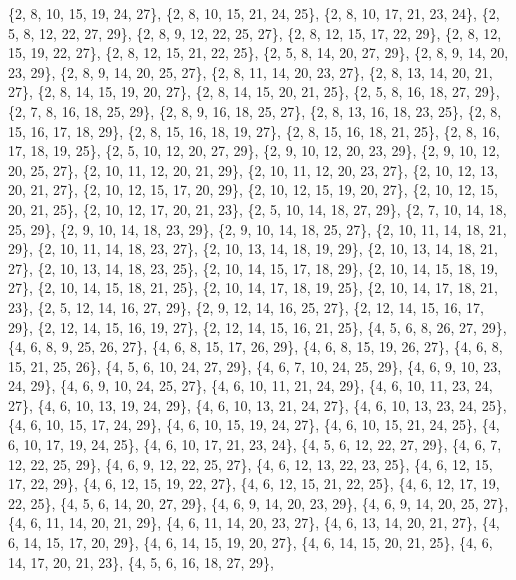 \documentclass[11pt,a4paper]{article}
\begin{document}
{\{2, 8, 10, 15, 19, 24, 27\}, \{2, 8, 10, 15, 21, 24, 25\}, \{2, 8, 10, 17, 21, 23, 24\}, \{2, 5, 8, 12, 22, 27, 29\}, \{2, 8, 9, 12, 22, 25, 27\},
\{2, 8, 12, 15, 17, 22, 29\}, \{2, 8, 12, 15, 19, 22, 27\}, \{2, 8, 12, 15, 21, 22, 25\}, \{2, 5, 8, 14, 20, 27, 29\}, \{2, 8, 9, 14, 20, 23, 29\},
\{2, 8, 9, 14, 20, 25, 27\}, \{2, 8, 11, 14, 20, 23, 27\}, \{2, 8, 13, 14, 20, 21, 27\}, \{2, 8, 14, 15, 19, 20, 27\}, \{2, 8, 14, 15, 20, 21, 25\},
\{2, 5, 8, 16, 18, 27, 29\}, \{2, 7, 8, 16, 18, 25, 29\}, \{2, 8, 9, 16, 18, 25, 27\}, \{2, 8, 13, 16, 18, 23, 25\}, \{2, 8, 15, 16, 17, 18, 29\},
\{2, 8, 15, 16, 18, 19, 27\}, \{2, 8, 15, 16, 18, 21, 25\}, \{2, 8, 16, 17, 18, 19, 25\}, \{2, 5, 10, 12, 20, 27, 29\}, \{2, 9, 10, 12, 20, 23, 29\},
\{2, 9, 10, 12, 20, 25, 27\}, \{2, 10, 11, 12, 20, 21, 29\}, \{2, 10, 11, 12, 20, 23, 27\}, \{2, 10, 12, 13, 20, 21, 27\}, \{2, 10, 12, 15, 17, 20, 29\},
\{2, 10, 12, 15, 19, 20, 27\}, \{2, 10, 12, 15, 20, 21, 25\}, \{2, 10, 12, 17, 20, 21, 23\}, \{2, 5, 10, 14, 18, 27, 29\}, \{2, 7, 10, 14, 18, 25, 29\},
\{2, 9, 10, 14, 18, 23, 29\}, \{2, 9, 10, 14, 18, 25, 27\}, \{2, 10, 11, 14, 18, 21, 29\}, \{2, 10, 11, 14, 18, 23, 27\}, \{2, 10, 13, 14, 18, 19, 29\},
\{2, 10, 13, 14, 18, 21, 27\}, \{2, 10, 13, 14, 18, 23, 25\}, \{2, 10, 14, 15, 17, 18, 29\}, \{2, 10, 14, 15, 18, 19, 27\}, \{2, 10, 14, 15, 18, 21, 25\},
\{2, 10, 14, 17, 18, 19, 25\}, \{2, 10, 14, 17, 18, 21, 23\}, \{2, 5, 12, 14, 16, 27, 29\}, \{2, 9, 12, 14, 16, 25, 27\}, \{2, 12, 14, 15, 16, 17, 29\},
\{2, 12, 14, 15, 16, 19, 27\}, \{2, 12, 14, 15, 16, 21, 25\}, \{4, 5, 6, 8, 26, 27, 29\}, \{4, 6, 8, 9, 25, 26, 27\}, \{4, 6, 8, 15, 17, 26, 29\},
\{4, 6, 8, 15, 19, 26, 27\}, \{4, 6, 8, 15, 21, 25, 26\}, \{4, 5, 6, 10, 24, 27, 29\}, \{4, 6, 7, 10, 24, 25, 29\}, \{4, 6, 9, 10, 23, 24, 29\},
\{4, 6, 9, 10, 24, 25, 27\}, \{4, 6, 10, 11, 21, 24, 29\}, \{4, 6, 10, 11, 23, 24, 27\}, \{4, 6, 10, 13, 19, 24, 29\}, \{4, 6, 10, 13, 21, 24, 27\},
\{4, 6, 10, 13, 23, 24, 25\}, \{4, 6, 10, 15, 17, 24, 29\}, \{4, 6, 10, 15, 19, 24, 27\}, \{4, 6, 10, 15, 21, 24, 25\}, \{4, 6, 10, 17, 19, 24, 25\},
\{4, 6, 10, 17, 21, 23, 24\}, \{4, 5, 6, 12, 22, 27, 29\}, \{4, 6, 7, 12, 22, 25, 29\}, \{4, 6, 9, 12, 22, 25, 27\}, \{4, 6, 12, 13, 22, 23, 25\},
\{4, 6, 12, 15, 17, 22, 29\}, \{4, 6, 12, 15, 19, 22, 27\}, \{4, 6, 12, 15, 21, 22, 25\}, \{4, 6, 12, 17, 19, 22, 25\}, \{4, 5, 6, 14, 20, 27, 29\},
\{4, 6, 9, 14, 20, 23, 29\}, \{4, 6, 9, 14, 20, 25, 27\}, \{4, 6, 11, 14, 20, 21, 29\}, \{4, 6, 11, 14, 20, 23, 27\}, \{4, 6, 13, 14, 20, 21, 27\},
\{4, 6, 14, 15, 17, 20, 29\}, \{4, 6, 14, 15, 19, 20, 27\}, \{4, 6, 14, 15, 20, 21, 25\}, \{4, 6, 14, 17, 20, 21, 23\}, \{4, 5, 6, 16, 18, 27, 29\},
}
\end{document}
